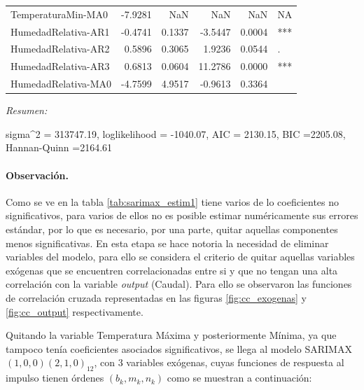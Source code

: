 \documentclass[12pt,oneside]{book}\usepackage[]{graphicx}\usepackage[]{color}
\newenvironment{knitrout}{}{} %
\theoremstyle{definition} %
\begin{document}
\begin{knitrout}
\begin{table}
\begin{threeparttable}
\begin{tabular}[t]{lrrrrl}
TemperaturaMin-MA0 & -7.9281 & NaN & NaN & NaN & NA\\
\addlinespace
\rowcolor{gray!6}  HumedadRelativa-AR1 & -0.4741 & 0.1337 & -3.5447 & 0.0004 & ***\\
HumedadRelativa-AR2 & 0.5896 & 0.3065 & 1.9236 & 0.0544 & .\\
\rowcolor{gray!6}  HumedadRelativa-AR3 & 0.6813 & 0.0604 & 11.2786 & 0.0000 & ***\\
HumedadRelativa-MA0 & -4.7599 & 4.9517 & -0.9613 & 0.3364 & \\
\bottomrule
\end{tabular}
\begin{tablenotes}
\item \textit{Resumen:} 
\item sigma\textasciicircum{}2 = 313747.19, loglikelihood = -1040.07, AIC = 2130.15, BIC =2205.08, Hannan-Quinn =2164.61
\end{tablenotes}
\end{threeparttable}
\end{table}


\end{knitrout}







\paragraph{Observación.} Como se ve en la tabla \ref{tab:sarimax_estim1} tiene varios de lo coeficientes no significativos, para varios de ellos no es posible estimar numéricamente sus errores estándar, por lo que es necesario, por una parte, quitar aquellas componentes menos significativas.  En esta etapa se hace notoria la necesidad de eliminar variables del modelo, para ello se considera el criterio de quitar aquellas variables exógenas que se encuentren correlacionadas entre si y que no tengan una alta correlación con la variable \textit{output} (Caudal). Para ello se observaron las funciones de correlación cruzada representadas en las figuras \ref{fig:cc_exogenas} y \ref{fig:cc_output} respectivamente.




Quitando la variable Temperatura Máxima y posteriormente Mínima, ya que tampoco tenía coeficientes asociados significativos, se llega al modelo SARIMAX $(1,0,0)(2,1,0)_{12}$, con 3 variables exógenas, cuyas funciones de respuesta al impulso tienen órdenes $(b_k,m_k,n_k)$ como se muestran a continuación:
\end{document}
